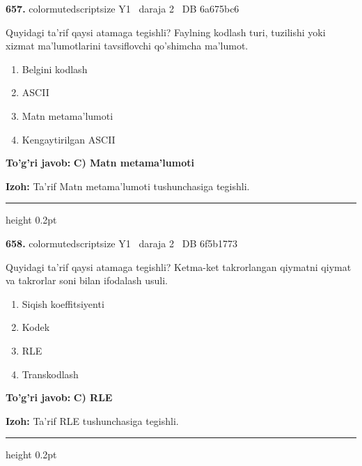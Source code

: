 \documentclass[10pt,a4paper,oneside]{article}
\begin{document}
\noindent\textbf{\color{ink}657.}  {color{muted}scriptsize Y1 \textbullet\ daraja 2 \textbullet\ DB 6a675bc6}
\par
Quyidagi ta'rif qaysi atamaga tegishli? Faylning kodlash turi, tuzilishi yoki xizmat ma'lumotlarini tavsiflovchi qo'shimcha ma'lumot.
\begin{enumerate}[label=\Alph*),leftmargin=9mm]
\item Belgini kodlash
\item ASCII
\item Matn metama'lumoti
\item Kengaytirilgan ASCII
\end{enumerate}
\begin{tcolorbox}[enhanced,breakable,colback=teal!4,colframe=teal!50!black,boxrule=0.5pt,arc=1.1mm,left=3mm,right=3mm,top=1.7mm,bottom=1.7mm,before skip=2mm,after skip=2mm]
\textbf{\color{teal}To'g'ri javob:} \textbf{C) Matn metama'lumoti}
\par\smallskip
\textbf{Izoh:} Ta'rif Matn metama'lumoti tushunchasiga tegishli.
\end{tcolorbox}
\vspace{2mm}\hrule height 0.2pt \vspace{3mm}

\noindent\textbf{\color{ink}658.}  {color{muted}scriptsize Y1 \textbullet\ daraja 2 \textbullet\ DB 6f5b1773}
\par
Quyidagi ta'rif qaysi atamaga tegishli? Ketma-ket takrorlangan qiymatni qiymat va takrorlar soni bilan ifodalash usuli.
\begin{enumerate}[label=\Alph*),leftmargin=9mm]
\item Siqish koeffitsiyenti
\item Kodek
\item RLE
\item Transkodlash
\end{enumerate}
\begin{tcolorbox}[enhanced,breakable,colback=teal!4,colframe=teal!50!black,boxrule=0.5pt,arc=1.1mm,left=3mm,right=3mm,top=1.7mm,bottom=1.7mm,before skip=2mm,after skip=2mm]
\textbf{\color{teal}To'g'ri javob:} \textbf{C) RLE}
\par\smallskip
\textbf{Izoh:} Ta'rif RLE tushunchasiga tegishli.
\end{tcolorbox}
\vspace{2mm}\hrule height 0.2pt \vspace{3mm}
\end{document}
